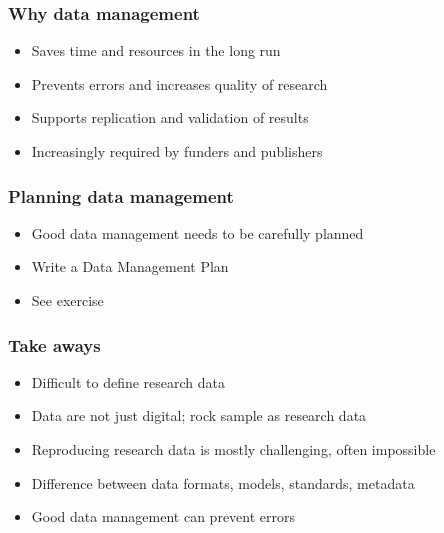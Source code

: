 \documentclass{beamer}
\begin{document}
\begin{frame}
  \frametitle{Why data management}
  
  \begin{itemize}
    \item Saves time and resources in the long run
    \item Prevents errors and increases quality of research
    \item Supports replication and validation of results
    \item Increasingly required by funders and publishers
  \end{itemize}
\end{frame}

\begin{frame}
  \frametitle{Planning data management}
  
  \begin{itemize}
  \item Good data management needs to be carefully planned
  \item Write a Data Management Plan
  \item See exercise
  \end{itemize}
\end{frame}

\begin{frame}
  \frametitle{Take aways}
  
  \begin{itemize}
    \item Difficult to define research data
    \item Data are not just digital; rock sample as research data
    \item Reproducing research data is mostly challenging, often impossible
    \item Difference between data formats, models, standards, metadata
    \item Good data management can prevent errors
  \end{itemize}
\end{frame}
\end{document}
